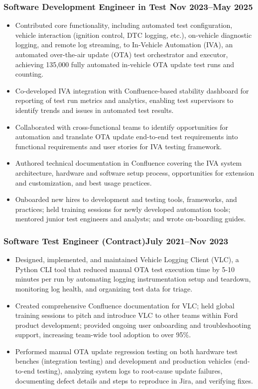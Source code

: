 \documentclass[11pt]{article}
\begin{document}
\subsubsection{Software Development Engineer in Test \hfill Nov 2023--May 2025}
\begin{itemize}
  \item Contributed core functionality, including automated test configuration,
  vehicle interaction (ignition control, DTC logging, etc.), on-vehicle 
  diagnostic logging, and remote log streaming, to In-Vehicle Automation (IVA), 
  an automated over-the-air update (OTA) test orchestrator and executor, achieving 135,000 fully 
  automated in-vehicle OTA update test runs and counting.
  \item Co-developed IVA integration with Confluence-based stability dashboard for reporting of 
  test run metrics and analytics, enabling test supervisors to identify trends and issues in automated test results.
  \item Collaborated with cross-functional teams to identify opportunities for 
  automation and translate OTA update end-to-end test requirements into functional requirements and user stories for IVA testing framework.
  \item Authored technical documentation in Confluence covering the IVA system 
  architecture, hardware and software setup process, opportunities for extension and customization, and best usage practices.
  \item Onboarded new hires to development and testing tools, frameworks, and practices; held training sessions for newly developed automation 
  tools; mentored junior test engineers and analysts; and wrote on-boarding guides.
\end{itemize}

\subsubsection{Software Test Engineer (Contract)\hfill July 2021--Nov 2023}
\begin{itemize}
  \item Designed, implemented, and maintained Vehicle Logging Client (VLC),
  a Python CLI tool that reduced manual OTA test execution time by 5-10 minutes 
  per run by automating logging instrumentation setup and teardown, monitoring 
  log health, and organizing test data for triage.
  \item Created comprehensive Confluence documentation for VLC; held global training 
  sessions to pitch and introduce VLC to other teams within Ford product development;
  provided ongoing user onboarding and troubleshooting support, increasing team-wide 
  tool adoption to over 95\%.
  \item Performed manual OTA update regression testing on both hardware test 
  benches (integration testing) and development and production vehicles 
  (end-to-end testing), analyzing system logs to root-cause update failures, 
  documenting defect details and steps to reproduce in Jira, and verifying fixes.
\end{itemize}
\end{document}
